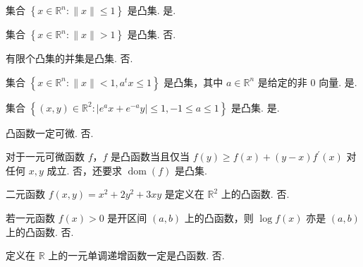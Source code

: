 

\usepackage{tikz}

\newcommand{\Title}{CVX HW}
\renewcommand{\due}{due: 11 weeks}
\newcommand{\tr}{\operatorname{tr}} %
\newcommand{\dom}{\operatorname{dom}} %
\newcommand{\minimize}{\operatorname{minimize}} %
\newcommand{\subject}{\operatorname{subject\ to}}

\newcommand{\todo}{{\color{red} to do}} %
\newcommand{\myline}{{\line(1,0){450}}} %




\begin{problem}[判断]
    集合 $\left\{x \in \mathbb{R}^n: \|x\| \le 1\right\}$ 是凸集.
    \Answer 是.
\end{problem}

\begin{problem}[判断]
    集合 $\left\{x \in \mathbb{R}^n: \|x\| > 1\right\}$ 是凸集.
    \Answer 否.
\end{problem}

\begin{problem}[判断]
    有限个凸集的并集是凸集.
    \Answer 否.
\end{problem}

\begin{problem}[判断]
    集合 $\left\{x \in \mathbb{R}^n: \|x\| < 1, a^tx \le 1\right\}$ 是凸集，其中 $a \in \mathbb{R}^n$ 是给定的非 0 向量.
    \Answer 是.
\end{problem}

\begin{problem}[判断]
    集合 $\left\{(x, y) \in \mathbb{R}^2: |e^ax + e^{-a}y| \le 1, -1 \le a \le 1\right\}$ 是凸集.
    \Answer 是.
\end{problem}

\begin{problem}[判断]
    凸函数一定可微.
    \Answer 否.
\end{problem}

\begin{problem}[判断]
    对于一元可微函数 $f$，$f$ 是凸函数当且仅当 $f(y) \ge f(x) + (y - x)f^\prime(x)$ 对任何 $x, y$ 成立.
    \Answer 否，还要求 $\dom(f)$ 是凸集.
\end{problem}

\begin{problem}[判断]
    二元函数 $f(x, y) = x^2 + 2y^2 + 3xy$ 是定义在 $\mathbb{R}^2$ 上的凸函数.
    \Answer 否.
\end{problem}

\begin{problem}[判断]
    若一元函数 $f(x) > 0$ 是开区间 $(a, b)$ 上的凸函数，则 $\log f(x)$ 亦是 $(a, b)$ 上的凸函数.
    \Answer 否.
\end{problem}

\begin{problem}[判断]
    定义在 $\mathbb{R}$ 上的一元单调递增函数一定是凸函数.
    \Answer 否.
\end{problem}

